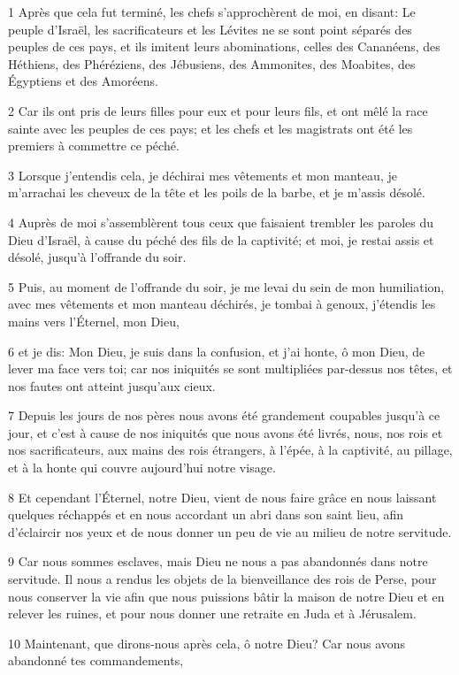 \par 1 Après que cela fut terminé, les chefs s'approchèrent de moi, en disant: Le peuple d'Israël, les sacrificateurs et les Lévites ne se sont point séparés des peuples de ces pays, et ils imitent leurs abominations, celles des Cananéens, des Héthiens, des Phéréziens, des Jébusiens, des Ammonites, des Moabites, des Égyptiens et des Amoréens.
\par 2 Car ils ont pris de leurs filles pour eux et pour leurs fils, et ont mêlé la race sainte avec les peuples de ces pays; et les chefs et les magistrats ont été les premiers à commettre ce péché.
\par 3 Lorsque j'entendis cela, je déchirai mes vêtements et mon manteau, je m'arrachai les cheveux de la tête et les poils de la barbe, et je m'assis désolé.
\par 4 Auprès de moi s'assemblèrent tous ceux que faisaient trembler les paroles du Dieu d'Israël, à cause du péché des fils de la captivité; et moi, je restai assis et désolé, jusqu'à l'offrande du soir.
\par 5 Puis, au moment de l'offrande du soir, je me levai du sein de mon humiliation, avec mes vêtements et mon manteau déchirés, je tombai à genoux, j'étendis les mains vers l'Éternel, mon Dieu,
\par 6 et je dis: Mon Dieu, je suis dans la confusion, et j'ai honte, ô mon Dieu, de lever ma face vers toi; car nos iniquités se sont multipliées par-dessus nos têtes, et nos fautes ont atteint jusqu'aux cieux.
\par 7 Depuis les jours de nos pères nous avons été grandement coupables jusqu'à ce jour, et c'est à cause de nos iniquités que nous avons été livrés, nous, nos rois et nos sacrificateurs, aux mains des rois étrangers, à l'épée, à la captivité, au pillage, et à la honte qui couvre aujourd'hui notre visage.
\par 8 Et cependant l'Éternel, notre Dieu, vient de nous faire grâce en nous laissant quelques réchappés et en nous accordant un abri dans son saint lieu, afin d'éclaircir nos yeux et de nous donner un peu de vie au milieu de notre servitude.
\par 9 Car nous sommes esclaves, mais Dieu ne nous a pas abandonnés dans notre servitude. Il nous a rendus les objets de la bienveillance des rois de Perse, pour nous conserver la vie afin que nous puissions bâtir la maison de notre Dieu et en relever les ruines, et pour nous donner une retraite en Juda et à Jérusalem.
\par 10 Maintenant, que dirons-nous après cela, ô notre Dieu? Car nous avons abandonné tes commandements,
